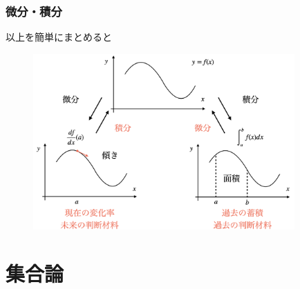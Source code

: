 


\begin{frame}
\frametitle{微分・積分}

以上を簡単にまとめると

 \begin{figure}[htbp]
 \begin{center} 
  \includegraphics[width=100mm]{calculus1/diff_int2.png}
 \end{center}
\end{figure}

\end{frame}








\section{集合論}

